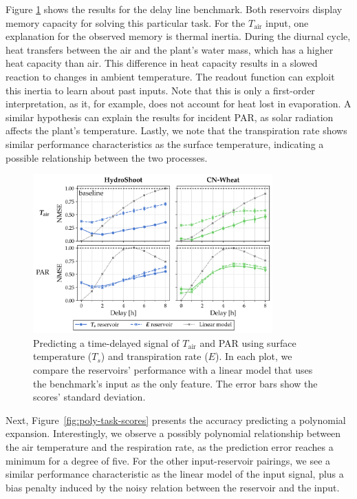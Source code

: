 Figure \ref{fig:delay-line-scores} shows the results for the delay line benchmark.
Both reservoirs display memory capacity for solving this particular task.
For the $T_\text{air}$ input, one explanation for the observed memory is thermal inertia.
During the diurnal cycle, heat transfers between the air and the plant's water mass, which has a higher heat capacity than air.
This difference in heat capacity results in a slowed reaction to changes in ambient temperature.
The readout function can exploit this inertia to learn about past inputs.
Note that this is only a first-order interpretation, as it, for example, does not account for heat lost in evaporation.
A similar hypothesis can explain the results for incident PAR, as solar radiation affects the plant's temperature.
Lastly, we note that the transpiration rate shows similar performance characteristics as the surface temperature, indicating a possible relationship between the two processes.

\begin{figure}[t]
	\centering
    \includegraphics[width=0.82\textwidth]{img/comp_delay_perf.png}
	\caption[Predicting a time-delayed signal of $T_{\text{air}}$ and PAR using surface temperature ($T_s$) and transpiration rate ($E$).]%
    {Predicting a time-delayed signal of $T_{\text{air}}$ and PAR using surface temperature ($T_s$) and transpiration rate ($E$).
    In each plot, we compare the reservoirs' performance with a linear model that uses the benchmark's input as the only feature.
    The error bars show the scores' standard deviation.}

	\label{fig:delay-line-scores}
\end{figure}


Next, \mbox{Figure \ref{fig:poly-task-scores}} presents the accuracy predicting a polynomial expansion.
Interestingly, we observe a possibly polynomial relationship between the air temperature and the respiration rate, as the prediction error reaches a minimum for a degree of five.
For the other input-reservoir pairings, we see a similar performance characteristic as the linear model of the input signal, plus a bias penalty induced by the noisy relation between the reservoir and the input.

